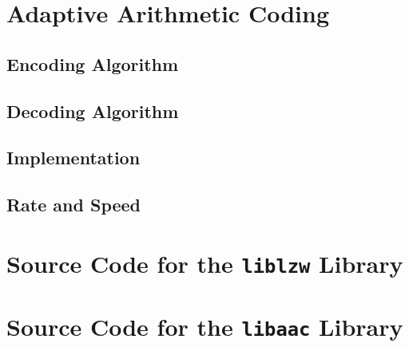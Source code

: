 \documentclass[a4paper, twocolumn]{article}
\begin{document}
    \clearpage
    \section{Adaptive Arithmetic Coding} \label{sec:adaptive_arithmetic_coding}
        \subsection{Encoding Algorithm} \label{sec:aac_encoding_algorithm}
        \subsection{Decoding Algorithm} \label{sec:aac_decoding_algorithm}
        \subsection{Implementation} \label{sec:aac_implementation}
        \subsection{Rate and Speed} \label{sec:aac_rate_and_speed}

    \appendix \onecolumn

    \clearpage
    \section{Source Code for the \texttt{liblzw} Library} \label{sec:liblzw}

    \clearpage
    \section{Source Code for the \texttt{libaac} Library} \label{sec:libaac}
\end{document}
